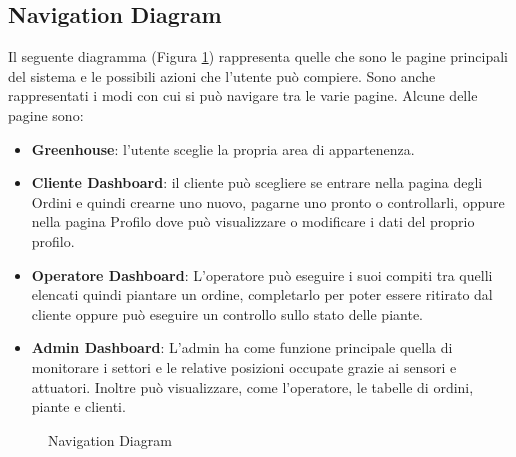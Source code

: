 \documentclass{article}
\begin{document}
\subsection{Navigation Diagram}
\label{subsec:nav-diagram}
Il seguente diagramma (Figura \ref{fig:diagram_navigation}) rappresenta quelle che sono le pagine principali del sistema e le possibili azioni che l’utente può compiere. Sono anche rappresentati i modi con cui si può navigare tra le varie pagine.
Alcune delle pagine sono:
\begin{itemize}
    \item \textbf{Greenhouse}: l'utente sceglie la propria area di appartenenza.
    \item \textbf{Cliente Dashboard}: il cliente può scegliere se entrare nella pagina degli Ordini e quindi crearne uno nuovo, pagarne uno pronto o controllarli, oppure nella pagina Profilo dove può visualizzare o modificare i dati del proprio profilo.
    \item \textbf{Operatore Dashboard}: L'operatore può eseguire i suoi compiti tra quelli elencati quindi piantare un ordine, completarlo per poter essere ritirato dal cliente oppure può eseguire un controllo sullo stato delle piante.
    \item \textbf{Admin Dashboard}: L'admin ha come funzione principale quella di monitorare i settori e le relative posizioni occupate grazie ai sensori e attuatori. Inoltre può visualizzare, come l'operatore, le tabelle di ordini, piante e clienti.
\end{itemize}
\begin{figure}[H]
    \centering
    \caption{Navigation Diagram}
    \label{fig:diagram_navigation}
\end{figure}
\end{document}
